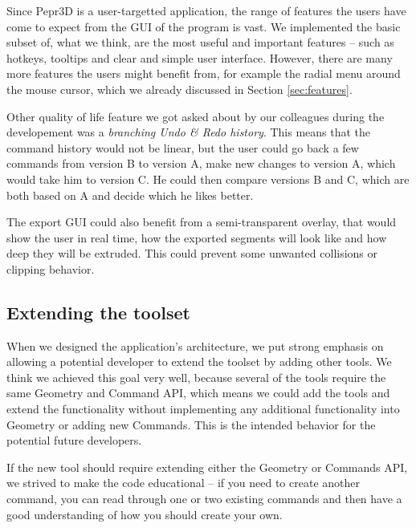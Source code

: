 Since Pepr3D is a user-targetted application, the range of features the users have come to expect from the GUI of the program is vast. We implemented the basic subset of, what we think, are the most useful and important features -- such as hotkeys, tooltips and clear and simple user interface. However, there are many more features the users might benefit from, for example the radial menu around the mouse cursor, which we already discussed in Section \ref{sec:features}.

Other quality of life feature we got asked about by our colleagues during the developement was a \textit{branching Undo \& Redo history}. This means that the command history would not be linear, but the user could go back a few commands from version B to version A, make new changes to version A, which would take him to version C. He could then compare versions B and C, which are both based on A and decide which he likes better.

The export GUI could also benefit from a semi-transparent overlay, that would show the user in real time, how the exported segments will look like and how deep they will be extruded. This could prevent some unwanted collisions or clipping behavior.

\subsection{Extending the toolset}

When we designed the application's architecture, we put strong emphasis on allowing a potential developer to extend the toolset by adding other tools. We think we achieved this goal very well, because several of the tools require the same Geometry and Command API, which means we could add the tools and extend the functionality without implementing any additional functionality into Geometry or adding new Commands. This is the intended behavior for the potential future developers.

If the new tool should require extending either the Geometry or Commands API, we strived to make the code educational -- if you need to create another command, you can read through one or two existing commands and then have a good understanding of how you should create your own.